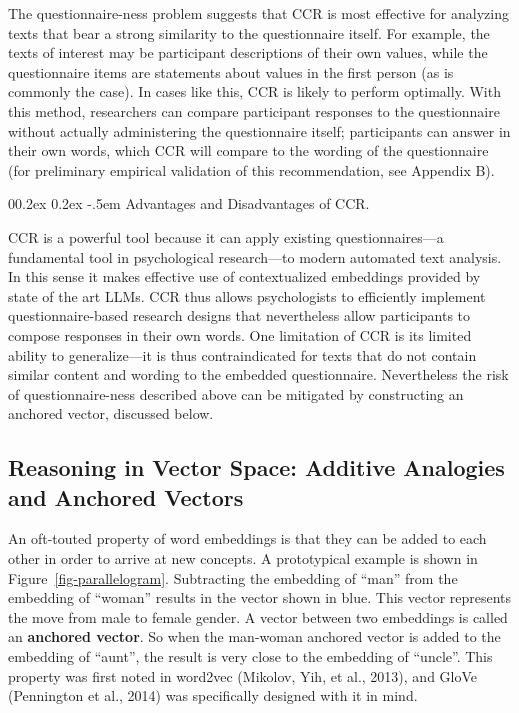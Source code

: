 \documentclass[
  man,
  floatsintext,
  longtable,
  nolmodern,
  notxfonts,
  notimes,
  colorlinks=true,linkcolor=blue,citecolor=blue,urlcolor=blue]{apa7}
\makeatletter
\renewcommand{\paragraph}{\@startsection{paragraph}{4}{\parindent}%
	{0\baselineskip \@plus 0.2ex \@minus 0.2ex}%
	{-.5em}%
	{\normalfont\normalsize\bfseries\typesectitle}}
\makeatother
\begin{document}
The questionnaire-ness problem suggests that CCR is most effective for
analyzing texts that bear a strong similarity to the questionnaire
itself. For example, the texts of interest may be participant
descriptions of their own values, while the questionnaire items are
statements about values in the first person (as is commonly the case).
In cases like this, CCR is likely to perform optimally. With this
method, researchers can compare participant responses to the
questionnaire without actually administering the questionnaire itself;
participants can answer in their own words, which CCR will compare to
the wording of the questionnaire (for preliminary empirical validation
of this recommendation, see Appendix B).

\paragraph{Advantages and Disadvantages of
CCR.}\label{advantages-and-disadvantages-of-ccr}

CCR is a powerful tool because it can apply existing questionnaires---a
fundamental tool in psychological research---to modern automated text
analysis. In this sense it makes effective use of contextualized
embeddings provided by state of the art LLMs. CCR thus allows
psychologists to efficiently implement questionnaire-based research
designs that nevertheless allow participants to compose responses in
their own words. One limitation of CCR is its limited ability to
generalize---it is thus contraindicated for texts that do not contain
similar content and wording to the embedded questionnaire. Nevertheless
the risk of questionnaire-ness described above can be mitigated by
constructing an anchored vector, discussed below.

\subsection{Reasoning in Vector Space: Additive Analogies and Anchored
Vectors}\label{reasoning-in-vector-space-additive-analogies-and-anchored-vectors}

An oft-touted property of word embeddings is that they can be added to
each other in order to arrive at new concepts. A prototypical example is
shown in Figure~\ref{fig-parallelogram}. Subtracting the embedding of
``man'' from the embedding of ``woman'' results in the vector shown in
blue. This vector represents the move from male to female gender. A
vector between two embeddings is called an \textbf{anchored vector}. So
when the man-woman anchored vector is added to the embedding of
``aunt'', the result is very close to the embedding of ``uncle''. This
property was first noted in word2vec (Mikolov, Yih, et al., 2013), and
GloVe (Pennington et al., 2014) was specifically designed with it in
mind.
\end{document}
